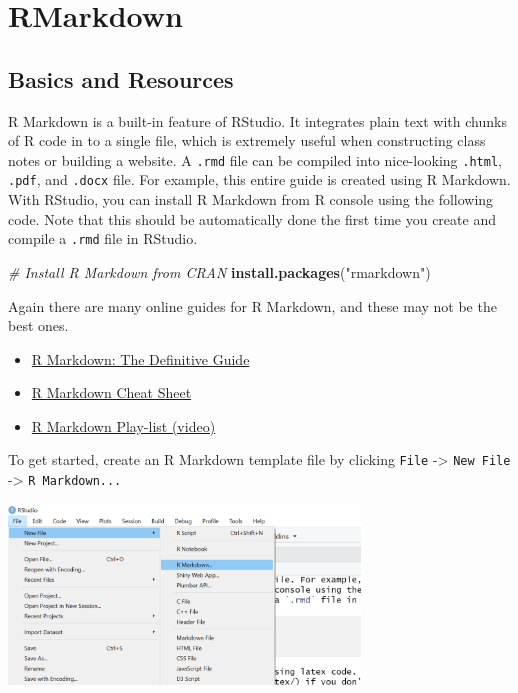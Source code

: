 \documentclass[
]{book}
\newenvironment{Shaded}{\begin{snugshade}}{\end{snugshade}}
\newcommand{\CommentTok}[1]{\textcolor[rgb]{0.56,0.35,0.01}{\textit{#1}}}
\newcommand{\FunctionTok}[1]{\textcolor[rgb]{0.13,0.29,0.53}{\textbf{#1}}}
\newcommand{\NormalTok}[1]{#1}
\newcommand{\StringTok}[1]{\textcolor[rgb]{0.31,0.60,0.02}{#1}}
\providecommand{\tightlist}{%
  \setlength{\itemsep}{0pt}\setlength{\parskip}{0pt}}
\theoremstyle{definition}
\theoremstyle{definition}
\theoremstyle{definition}
\theoremstyle{definition}
\theoremstyle{remark}
\begin{document}
\hypertarget{rmarkdown}{%
\chapter{RMarkdown}\label{rmarkdown}}

\hypertarget{basics-and-resources}{%
\section{Basics and Resources}\label{basics-and-resources}}

R Markdown is a built-in feature of RStudio. It integrates plain text with chunks of R code in to a single file, which is extremely useful when constructing class notes or building a website. A \texttt{.rmd} file can be compiled into nice-looking \texttt{.html}, \texttt{.pdf}, and \texttt{.docx} file. For example, this entire guide is created using R Markdown. With RStudio, you can install R Markdown from R console using the following code. Note that this should be automatically done the first time you create and compile a \texttt{.rmd} file in RStudio.

\begin{Shaded}
\begin{Highlighting}[]
    \CommentTok{\# Install R Markdown from CRAN}
    \FunctionTok{install.packages}\NormalTok{(}\StringTok{"rmarkdown"}\NormalTok{)}
\end{Highlighting}
\end{Shaded}

Again there are many online guides for R Markdown, and these may not be the best ones.

\begin{itemize}
\tightlist
\item
  \href{https://bookdown.org/yihui/rmarkdown/}{R Markdown: The Definitive Guide}
\item
  \href{https://www.rstudio.com/wp-content/uploads/2015/02/rmarkdown-cheatsheet.pdf}{R Markdown Cheat Sheet}
\item
  \href{https://www.youtube.com/playlist?list=PLBgxzZMu3GpNgd07DwmS-2odHtMO6MWGH}{R Markdown Play-list (video)}
\end{itemize}

To get started, create an R Markdown template file by clicking \texttt{File} -\textgreater{} \texttt{New\ File} -\textgreater{} \texttt{R\ Markdown...}

\includegraphics[width=0.7\textwidth,height=\textheight]{images/Create.png}
\end{document}
